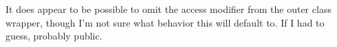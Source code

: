 It does appear to be possible to omit the access modifier from the outer
class wrapper, though I'm not sure what behavior this will default to.
If I had to guess, probably public.
